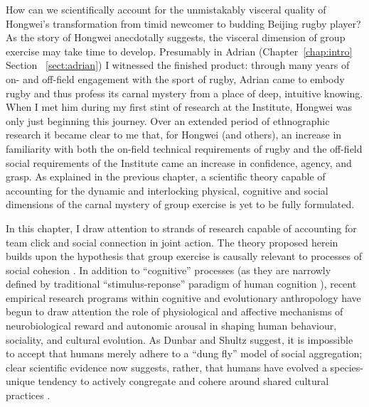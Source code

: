 \begin{CJK}{UTF8}{gbsn}
How can we scientifically account for the unmistakably visceral quality of Hongwei's transformation from timid newcomer to budding Beijing rugby player?  As the story of Hongwei anecdotally suggests, the visceral dimension of group exercise may take time to develop.  Presumably in Adrian (Chapter~\ref{chap:intro} Section ~\ref{sect:adrian}) I witnessed the finished product: through many years of on- and off-field engagement with the sport of rugby, Adrian came to embody rugby and thus profess its carnal mystery from a place of deep, intuitive knowing.  When I met him during my first stint of research at the Institute, Hongwei was only just beginning this journey.  Over an extended period of ethnographic research it became clear to me that, for Hongwei (and others), an increase in familiarity with both the on-field technical requirements of rugby and the off-field social requirements of the Institute came an increase in confidence, agency, and grasp.  As explained in the previous chapter, a scientific theory capable of accounting for the dynamic and interlocking physical, cognitive and social dimensions of the carnal mystery of group exercise is yet to be fully formulated.

In this chapter, I draw attention to strands of research capable of accounting for team click and social connection in joint action.  The theory proposed herein builds upon the hypothesis that group exercise is causally relevant to processes of social cohesion \citep{Dunbar2010,Whitehouse2014,Cohen2017}. In addition to ``cognitive'' processes (as they are narrowly defined by traditional ``stimulus-reponse'' paradigm of human cognition \citep[e.g.][]{Marr1985}), recent empirical research programs within cognitive and evolutionary anthropology have begun to draw attention the role of physiological and affective mechanisms of neurobiological reward and autonomic arousal in shaping human behaviour, sociality, and cultural evolution.  As Dunbar and Shultz suggest, it is impossible to accept that humans merely adhere to a ``dung fly'' model of social aggregation; clear scientific evidence now suggests, rather, that humans have evolved a species-unique tendency to actively congregate and cohere around shared cultural practices \citep[cf.][]{Tomasello2005}.


\end{CJK}
